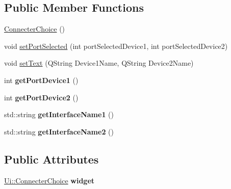 \subsection*{Public Member Functions}
\begin{DoxyCompactItemize}
\item 
\hyperlink{class_connecter_choice_af94991fb3b694bd922443af45e20b160}{Connecter\-Choice} ()
\item 
void \hyperlink{class_connecter_choice_a4f1a2ac322da165427cb5d8cac8aa786}{set\-Port\-Selected} (int port\-Selected\-Device1, int port\-Selected\-Device2)
\item 
void \hyperlink{class_connecter_choice_a23767173ce3a708d7484504afd55cbb5}{set\-Text} (Q\-String Device1\-Name, Q\-String Device2\-Name)
\item 
\hypertarget{class_connecter_choice_ab0fc6890c4c0a52ff8848882a3f7d1c2}{int {\bfseries get\-Port\-Device1} ()}\label{class_connecter_choice_ab0fc6890c4c0a52ff8848882a3f7d1c2}

\item 
\hypertarget{class_connecter_choice_a6c73ba417b9d1cc70ae4b8dae4fe60d8}{int {\bfseries get\-Port\-Device2} ()}\label{class_connecter_choice_a6c73ba417b9d1cc70ae4b8dae4fe60d8}

\item 
\hypertarget{class_connecter_choice_a5e687ff913ad714f1e9348867e96f8c9}{std\-::string {\bfseries get\-Interface\-Name1} ()}\label{class_connecter_choice_a5e687ff913ad714f1e9348867e96f8c9}

\item 
\hypertarget{class_connecter_choice_a8add5bde956816343ce1e881c6655d18}{std\-::string {\bfseries get\-Interface\-Name2} ()}\label{class_connecter_choice_a8add5bde956816343ce1e881c6655d18}

\end{DoxyCompactItemize}
\subsection*{Public Attributes}
\begin{DoxyCompactItemize}
\item 
\hypertarget{class_connecter_choice_a9977ad99795e7bd6d0d9e9e64ebe653d}{\hyperlink{class_ui_1_1_connecter_choice}{Ui\-::\-Connecter\-Choice} {\bfseries widget}}\label{class_connecter_choice_a9977ad99795e7bd6d0d9e9e64ebe653d}

\end{DoxyCompactItemize}


